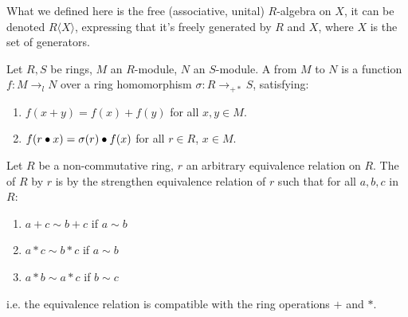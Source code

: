 \begin{remark}
    \label{mk:FreeAlgebra}

    What we defined here is the free (associative, unital) $R$-algebra on $X$, it can be denoted $R\langle X \rangle$,
    expressing that it's freely generated by $R$ and $X$, where $X$ is the set of generators.

\end{remark}

\begin{definition}
    \label{LinearMap}
    \leanok

    Let $R, S$ be rings, $M$ an $R$-module, $N$ an $S$-module.
    A  from $M$ to $N$ is a function $f : M \to_{l} N$ over a ring homomorphism $\sigma : R \to_{+*} S$, satisfying:

    \begin{enumerate}

    \item $f(x + y) = f(x) + f(y)$ for all $x, y \in M$.
    \item $f(r \bullet x) = \sigma(r) \bullet f(x)$ for all $r \in R$, $x \in M$.
    
    \end{enumerate}

\end{definition}

\begin{definition}
    \label{RingQuot}
    \leanok

    Let $R$ be a non-commutative ring, $r$ an arbitrary equivalence relation on $R$.
    The  of $R$ by $r$
    is by the strengthen equivalence relation of $r$ such that for all $a, b, c$ in $R$:

    \begin{enumerate}

    \item $a + c \sim b + c$ if $a \sim b$
    \item $a * c \sim b * c$ if $a \sim b$
    \item $a * b \sim a * c$ if $b \sim c$
    
    \end{enumerate}

    i.e. the equivalence relation is compatible with the ring operations $+$ and $*$.

\end{definition}

